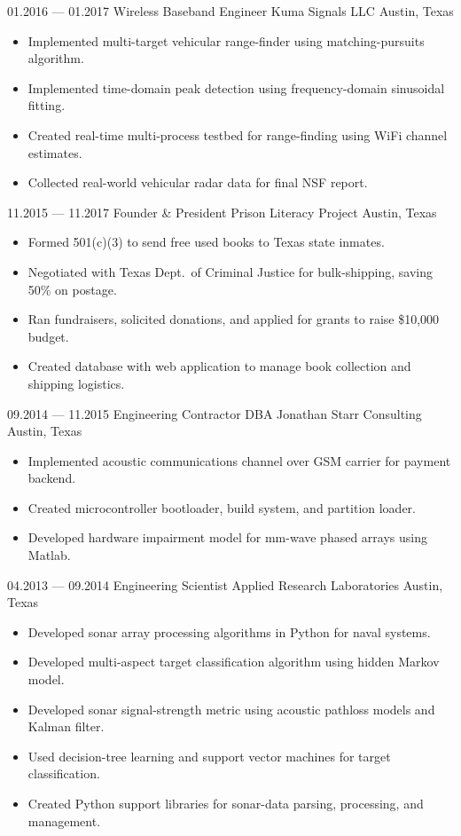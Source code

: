 \documentclass[11pt,a4paper,sans]{moderncv}
\begin{document}
\cventry%
    {01.2016 --- 01.2017}%
    {Wireless Baseband Engineer}%
    {Kuma Signals LLC}%
    {Austin, Texas}%
    {}%
    {%
    \begin{itemize}
        \item Implemented multi-target vehicular range-finder using matching-pursuits algorithm.
        \item Implemented time-domain peak detection using frequency-domain sinusoidal fitting.
        \item Created real-time multi-process testbed for range-finding using WiFi channel estimates.
        \item Collected real-world vehicular radar data for final NSF report.
    \end{itemize}%
    }

\cventry%
    {11.2015 --- 11.2017}%
    {Founder \& President}%
    {Prison Literacy Project}%
    {Austin, Texas}%
    {}%
    {%
    \begin{itemize}
        \item Formed 501(c)(3) to send free used books to Texas state inmates.
        \item Negotiated with Texas Dept.\ of Criminal Justice for bulk-shipping, saving 50\% on postage.
        \item Ran fundraisers, solicited donations, and applied for grants to raise \$10,000 budget.
        \item Created database with web application to manage book collection and shipping logistics.
    \end{itemize}%
    }

\cventry%
    {09.2014 --- 11.2015}%
    {Engineering Contractor}%
    {DBA Jonathan Starr Consulting}%
    {Austin, Texas}%
    {}%
    {%
    \begin{itemize}
        \item Implemented acoustic communications channel over GSM carrier for payment backend.
        \item Created microcontroller bootloader, build system, and partition loader.
        \item Developed hardware impairment model for mm-wave phased arrays using Matlab.
    \end{itemize}%
    }

\cventry%
    {04.2013 --- 09.2014}%
    {Engineering Scientist}%
    {Applied Research Laboratories}%
    {Austin, Texas}%
    {}%
    {%
    \begin{itemize}
        \item Developed sonar array processing algorithms in Python for naval systems.
        \item Developed multi-aspect target classification algorithm using hidden Markov model.
        \item Developed sonar signal-strength metric using acoustic pathloss models and Kalman filter.
        \item Used decision-tree learning and support vector machines for target classification.
        \item Created Python support libraries for sonar-data parsing, processing, and management.
    \end{itemize}%
    }
\end{document}

